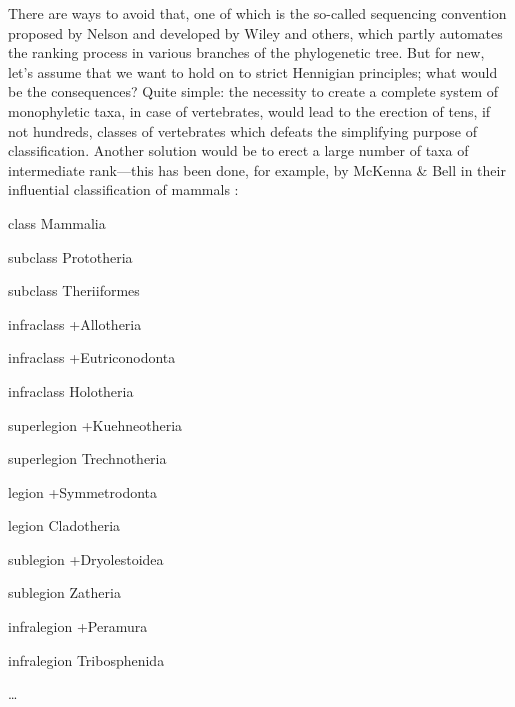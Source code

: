 \begin{artengenv}
There are ways to avoid that, one of which is the so-called sequencing convention proposed by Nelson
\parencite*{nelson_phylogenetic_1972}
and developed by Wiley
\parencite*{wiley_phylogenetics:_1981}
and others, which partly
automates the ranking process in various branches of the phylogenetic tree. But for new, let’s assume that we want to
hold on to strict Hennigian principles; what would be the consequences? Quite simple: the necessity to create a
complete system of monophyletic taxa, in case of vertebrates, would lead to the erection of tens, if not hundreds,
classes of vertebrates which defeats the simplifying purpose of classification. Another solution would be to erect a
large number of taxa of intermediate rank---this has been done, for example, by McKenna \& Bell in their influential
classification of mammals
\parencite*{mckenna_classification_1997}:

\begin{longitemize}
\item class Mammalia
\begin{longitemize}
\item subclass Prototheria
\item subclass Theriiformes
\begin{longitemize}
\item infraclass +Allotheria
\item infraclass +Eutriconodonta
\item infraclass Holotheria
\begin{longitemize}
\item superlegion +Kuehneotheria
\item superlegion Trechnotheria
\begin{longitemize}
\item legion +Symmetrodonta
\item legion Cladotheria
\begin{longitemize}
\item sublegion +Dryolestoidea
\item sublegion Zatheria
\begin{longitemize}
\item infralegion +Peramura
\item infralegion Tribosphenida
\item \ldots
\end{longitemize}
\end{longitemize}
\end{longitemize}
\end{longitemize}
\end{longitemize}
\end{longitemize}
\end{longitemize}


\end{artengenv}
